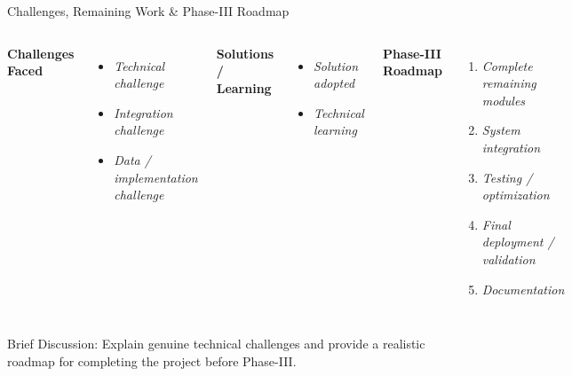 \documentclass[aspectratio=169,11pt]{beamer}
\newcommand{\smallnote}[1]{%
\vspace{0.08cm}
{\scriptsize\color{GEUGrey}#1}
}
\newcommand{\placeholder}[1]{%
\textit{\color{GEUGrey}#1}
}
\begin{document}
\begin{frame}{Challenges, Remaining Work \& Phase-III Roadmap}

\begin{columns}[T,totalwidth=\textwidth]


\textbf{\color{GEUBlue}Challenges Faced}

\begin{itemize}\itemsep2pt
\item \placeholder{Technical challenge}
\item \placeholder{Integration challenge}
\item \placeholder{Data / implementation challenge}
\end{itemize}

\vspace{2mm}

\textbf{\color{GEUBlue}Solutions / Learning}

\begin{itemize}\itemsep2pt
\item \placeholder{Solution adopted}
\item \placeholder{Technical learning}
\end{itemize}


\textbf{\color{GEUBlue}Phase-III Roadmap}

\begin{enumerate}\itemsep3pt
\item \placeholder{Complete remaining modules}
\item \placeholder{System integration}
\item \placeholder{Testing / optimization}
\item \placeholder{Final deployment / validation}
\item \placeholder{Documentation}
\end{enumerate}

\end{columns}

\vfill

\smallnote{
Brief Discussion: Explain genuine technical challenges and provide
a realistic roadmap for completing the project before Phase-III.
}

\end{frame}
\end{document}
